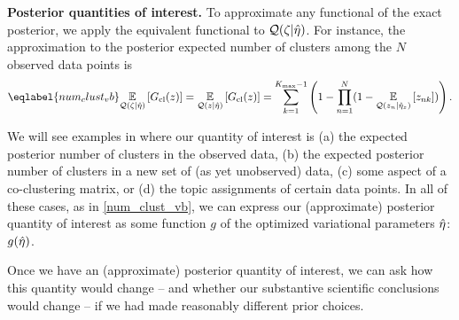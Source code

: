 \noindent \textbf{Posterior quantities of interest.} To approximate any
functional of the exact posterior, we apply the equivalent functional to
$\mathcal{Q}(\zeta \vert \hat\eta)$. For instance, the approximation to the posterior
expected number of clusters among the $N$ observed data points is
%
\begin{align} \eqlabel{num_clust_vb}
%
\expect{\q(\zeta \vert\etaopt)}{\nclusters(\z)} =
\expect{\q(\z\vert\etaopt)}{\nclusters(\z)} =
\sumkm \left(1 -  \prod_{\n=1}^\N
    (1 - \expect{\q(\z_\n \vert \etaoptz)}{\z_{\n\k}})\right).
%
\end{align}
%

We will see examples in  where our quantity of interest is (a)
the expected posterior number of clusters in the observed data, (b) the expected
posterior number of clusters in a new set of (as yet unobserved) data, (c) some
aspect of a co-clustering matrix, or (d) the topic assignments of certain data
points. In all of these cases, as in \eqref{num_clust_vb}, we can express our
(approximate) posterior quantity of interest as some function $g$ of the
optimized variational parameters $\hat\eta$: $g(\hat\eta)$.

Once we have an (approximate) posterior quantity of interest, we can ask how
this quantity would change -- and whether our substantive scientific conclusions
would change -- if we had made reasonably different prior choices.

